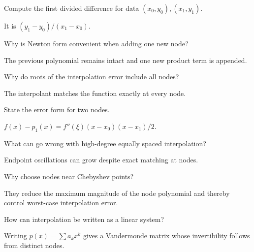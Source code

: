 \begin{problem}\label{prob:ii20-problem-05}
Compute the first divided difference for data $(x_0,y_0),(x_1,y_1)$.
\end{problem}
\begin{solution}
It is $(y_1-y_0)/(x_1-x_0)$.
\end{solution}

\begin{problem}\label{prob:ii20-problem-06}
Why is Newton form convenient when adding one new node?
\end{problem}
\begin{solution}
The previous polynomial remains intact and one new product term is appended.
\end{solution}

\begin{problem}\label{prob:ii20-problem-07}
Why do roots of the interpolation error include all nodes?
\end{problem}
\begin{solution}
The interpolant matches the function exactly at every node.
\end{solution}

\begin{problem}\label{prob:ii20-problem-08}
State the error form for two nodes.
\end{problem}
\begin{solution}
$f(x)-p_1(x)=f''(\xi)(x-x_0)(x-x_1)/2$.
\end{solution}

\begin{problem}\label{prob:ii20-problem-09}
What can go wrong with high-degree equally spaced interpolation?
\end{problem}
\begin{solution}
Endpoint oscillations can grow despite exact matching at nodes.
\end{solution}

\begin{problem}\label{prob:ii20-problem-10}
Why choose nodes near Chebyshev points?
\end{problem}
\begin{solution}
They reduce the maximum magnitude of the node polynomial and thereby control worst-case interpolation error.
\end{solution}

\begin{problem}\label{prob:ii20-problem-11}
How can interpolation be written as a linear system?
\end{problem}
\begin{solution}
Writing $p(x)=\sum a_kx^k$ gives a Vandermonde matrix whose invertibility follows from distinct nodes.
\end{solution}

